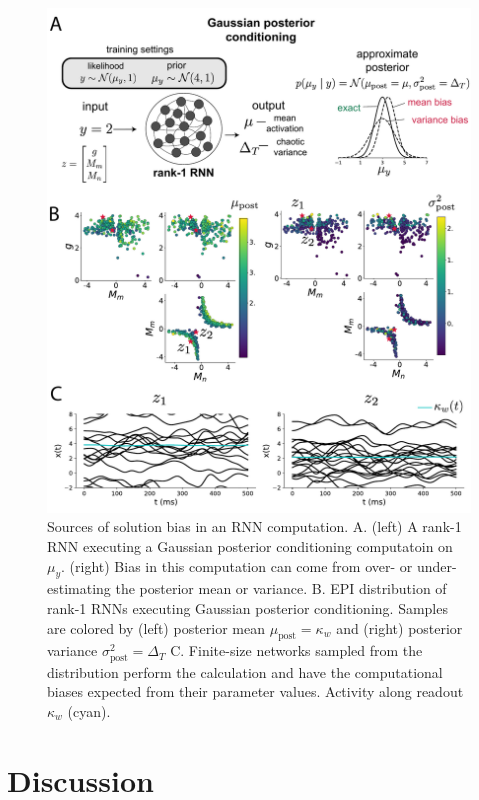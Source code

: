 \documentclass[11pt]{article}
\begin{document}
\begin{figure}
\begin{center}
\includegraphics[scale=0.7]{figures/fig5/fig5.pdf}
\end{center}
\caption{Sources of solution bias in an RNN computation.  A. (left) A rank-1 RNN executing a Gaussian posterior conditioning computatoin on $\mu_y$. (right) Bias in this computation can come from over- or under-estimating the posterior mean or variance. B. EPI distribution of rank-1 RNNs executing Gaussian posterior conditioning.  Samples are colored by (left) posterior mean $\mu_{\text{post}}=\kappa_w$ and (right) posterior variance $\sigma^2_{\text{post}}=\Delta_T$  C.  Finite-size networks sampled from the distribution perform the calculation and have the computational biases expected from their parameter values.  Activity along readout $\kappa_w$ (cyan).}
\end{figure}

\section{Discussion}
\end{document}
